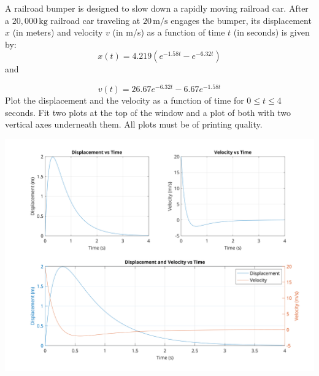 \documentclass[a4paper, 12pt]{report}
\def\ni{blue!20!white}
\def\link{blue!50!black}
\begin{document}
    \begin{tcolorbox}[title={\color{black}{\section{Q9}}}, colback=white, colframe=\ni, boxrule=1mm, width=1\textwidth]    
    A railroad bumper is designed to slow down a rapidly moving railroad car. After a \(20,000 \, \text{kg}\) railroad car traveling at \(20 \, \text{m/s}\) engages the bumper, its displacement \(x\) (in meters) and velocity \(v\) (in m/s) as a function of time \(t\) (in seconds) is given by:
    \[x(t) = 4.219(e^{-1.58t} - e^{-6.32t}) \]
    \centering
    and 
    
    \raggedright
    \[v(t) = 26.67 e^{-6.32t} - 6.67 e^{-1.58t}\]
    Plot the displacement and the velocity as a function of time for \(0 \leq t \leq 4\) seconds. Fit two plots at the top of the window and a plot of both with two vertical axes underneath them. All plots must be of printing quality.
    \end{tcolorbox}
    
    \includegraphics[width=1\textwidth]{images/railroad_bumper_plots.png}
    
    \newpage
    
\end{document}
